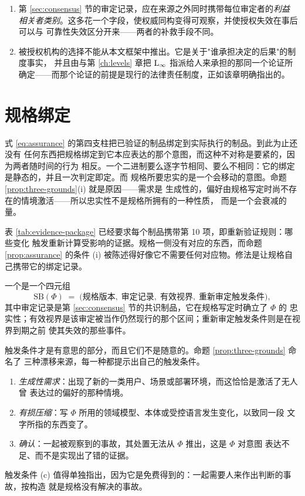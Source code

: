 \begin{remark}[对意图层设计的两项后果]\label{rmk:authority-design}
\begin{enumerate}[label=(\alph*)]
\item 第 \ref{sec:consensus} 节的审定记录，应在来源之外同时携带每位审定者的\emph{利益
      相关者类别}。这多花一个字段，使权威同构变得可观察，并使授权失效在事后可以与
      可靠性失效区分开来——两者的补救手段不同。
\item 被授权机构的选择不能从本文框架中推出。它是关于"谁承担决定的后果"的制度事实，
      并且由与第 \ref{ch:levels} 章把 $\mathrm{L}_{\infty}$ 指派给人来承担的那同一个论证所
      确定——而那个论证的前提是现行的法律责任制度，正如该章明确指出的。
\end{enumerate}
\end{remark}

\section{规格绑定}\label{sec:spec-binding}

式 \eqref{eq:assurance} 的第四支柱把已验证的制品绑定到实际执行的制品。到此为止还没有
任何东西把规格绑定到它本应表达的那个意图，而这种不对称是要紧的，因为两者随时间的行为
相反。一个二进制要么逐字节相同、要么不相同：它的绑定是静态的，并且一次判定即定。而
规格所要忠实的是一个会移动的意图。命题 \ref{prop:three-grounds}(i) 就是原因——需求是
生成性的，偏好由规格写定时尚不存在的情境激活——所以忠实性不是规格所拥有的一种性质，
而是一个会衰减的量。

表 \ref{tab:evidence-package} 已经要求每个制品携带第 10 项，即重新验证规则：哪些变化
触发重新计算受影响的证据。规格一侧没有对应的东西，而命题 \ref{prop:assurance} 的条件
(i) 被陈述得好像它不需要任何对应物。修法是让规格自己携带它的绑定记录。

\begin{definition}[规格绑定]\label{def:spec-binding}
一个是一个四元组
\[
\mathrm{SB}(\Phi) \;=\; \bigl(\text{规格版本},\; \text{审定记录},\;
\text{有效视界},\; \text{重新审定触发条件}\bigr),
\]
其中审定记录是第 \ref{sec:consensus} 节的共识制品，它在规格写定时确立了 $\Phi$ 的
忠实性；有效视界是该审定被当作仍然现行的那个区间；重新审定触发条件则是在视界到期之前
使其失效的那些事件。
\end{definition}

触发条件才是有意思的部分，而且它们不是随意的。命题 \ref{prop:three-grounds} 命名了
三种漂移来源，每一种都提示出自己的触发条件。
\begin{enumerate}[label=(\alph*)]
\item \emph{生成性需求}：出现了新的一类用户、场景或部署环境，而这恰恰是激活了无人曾
      表达过的偏好的那种情境。
\item \emph{有损压缩}：写 $\Phi$ 所用的领域模型、本体或受控语言发生变化，以致同一段
      文字所指的东西变了。
\item \emph{确认}：一起被观察到的事故，其处置无法从 $\Phi$ 推出，这是 $\Phi$ 对意图
      表达不足、而不是实现出了错的证据。
\end{enumerate}
触发条件 (c) 值得单独指出，因为它是免费得到的：一起需要人来作出判断的事故，按构造
就是规格没有解决的事故。

